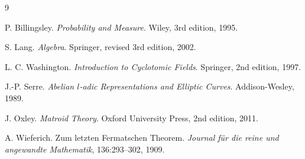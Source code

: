 \documentclass[11pt]{article}
\begin{document}
\begin{thebibliography}{9}

P. Billingsley.
\newblock \emph{Probability and Measure}.
\newblock Wiley, 3rd edition, 1995.

S. Lang.
\newblock \emph{Algebra}.
\newblock Springer, revised 3rd edition, 2002.

L. C. Washington.
\newblock \emph{Introduction to Cyclotomic Fields}.
\newblock Springer, 2nd edition, 1997.

J.-P. Serre.
\newblock \emph{Abelian \(l\)-adic Representations and Elliptic Curves}.
\newblock Addison-Wesley, 1989.

J. Oxley.
\newblock \emph{Matroid Theory}.
\newblock Oxford University Press, 2nd edition, 2011.

A. Wieferich.
\newblock Zum letzten Fermatschen Theorem.
\newblock \emph{Journal f\"ur die reine und angewandte Mathematik}, 136:293--302, 1909.

\end{thebibliography}
\end{document}
